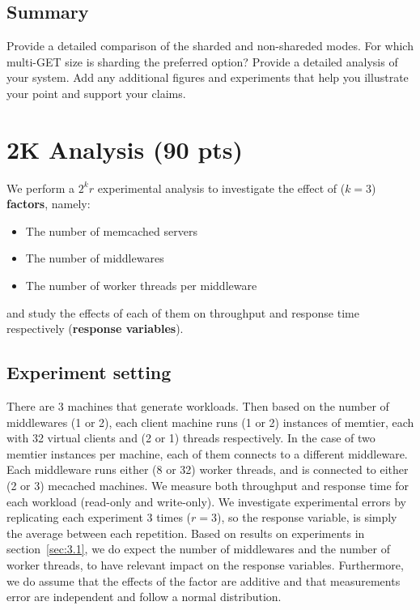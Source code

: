 \documentclass[11pt,a4paper]{article}
\begin{document}
\subsection{Summary}

Provide a detailed comparison of the sharded and non-shareded modes. For which multi-GET size is sharding the preferred option? Provide a detailed analysis of your system. Add any additional figures and experiments that help you illustrate your point and support your claims.

\section{2K Analysis (90 pts)}

We perform a $2^kr$ experimental analysis to investigate the effect of ($k=3$) \textbf{factors}, namely:

\begin{itemize}
    \item The number of memcached servers
    \item The number of middlewares
    \item The number of worker threads per middleware
\end{itemize}

and study the effects of each of them on throughput and response time respectively (\textbf{response variables}).

\subsection{Experiment setting}

There are 3 machines that generate workloads. Then based on the number of middlewares (1 or 2), each client machine runs (1 or 2) instances of memtier, each with 32 virtual clients and (2 or 1) threads respectively. In the case of two memtier instances per machine, each of them connects to a different middleware. 
Each middleware runs either (8 or 32) worker threads, and is connected to either (2 or 3) mecached machines. We measure both throughput and response time for each workload (read-only and write-only).
We investigate experimental errors by replicating each experiment 3 times ($r=3$), so the response variable, is simply the average between each repetition.
Based on results on experiments in section~\ref{sec:3.1}, we do expect the number of middlewares and the number of worker threads, to have relevant impact on the response variables. Furthermore, we do assume that the effects of the factor are additive and that measurements error are independent and follow a normal distribution.\\
\end{document}
